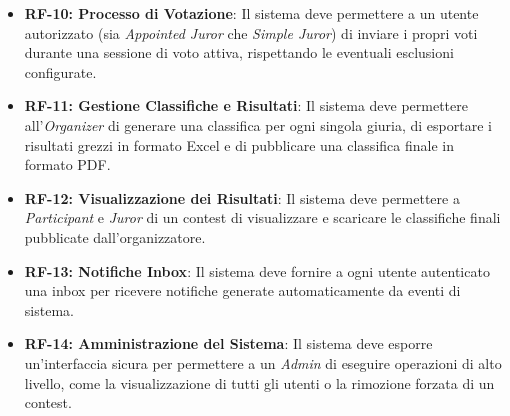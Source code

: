 \begin{itemize}
    \item \textbf{RF-10: Processo di Votazione}: Il sistema deve permettere a un utente autorizzato (sia \emph{Appointed Juror} che \emph{Simple Juror}) di inviare i propri voti durante una sessione di voto attiva, rispettando le eventuali esclusioni configurate.
    \item \textbf{RF-11: Gestione Classifiche e Risultati}: Il sistema deve permettere all'\emph{Organizer} di generare una classifica per ogni singola giuria, di esportare i risultati grezzi in formato Excel e di pubblicare una classifica finale in formato PDF\@.
    \item \textbf{RF-12: Visualizzazione dei Risultati}: Il sistema deve permettere a \emph{Participant} e \emph{Juror} di un contest di visualizzare e scaricare le classifiche finali pubblicate dall'organizzatore.
    \item \textbf{RF-13: Notifiche Inbox}: Il sistema deve fornire a ogni utente autenticato una inbox per ricevere notifiche generate automaticamente da eventi di sistema.
    \item \textbf{RF-14: Amministrazione del Sistema}: Il sistema deve esporre un'interfaccia sicura per permettere a un \emph{Admin} di eseguire operazioni di alto livello, come la visualizzazione di tutti gli utenti o la rimozione forzata di un contest.
\end{itemize}

